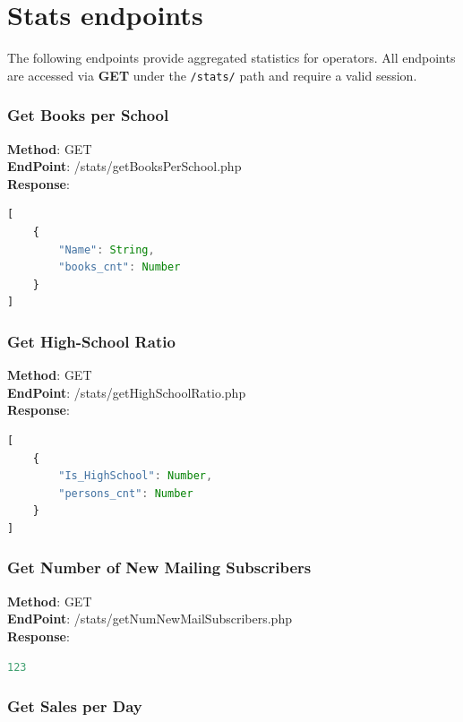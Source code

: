 \chapter{Stats endpoints}

The following endpoints provide aggregated statistics for operators. All endpoints are accessed via \textbf{GET} under the \texttt{/stats/} path and require a valid session.

\subsection*{Get Books per School}

\textbf{Method}: GET \\
\textbf{EndPoint}: /stats/getBooksPerSchool.php \\

\textbf{Response}:
\begin{lstlisting}[language=JavaScript, basicstyle=\ttfamily]
[
    {
        "Name": String,
        "books_cnt": Number
    }
]
\end{lstlisting}

\subsection*{Get High-School Ratio}

\textbf{Method}: GET \\
\textbf{EndPoint}: /stats/getHighSchoolRatio.php \\

\textbf{Response}:
\begin{lstlisting}[language=JavaScript, basicstyle=\ttfamily]
[
    {
        "Is_HighSchool": Number,
        "persons_cnt": Number
    }
]
\end{lstlisting}

\subsection*{Get Number of New Mailing Subscribers}

\textbf{Method}: GET \\
\textbf{EndPoint}: /stats/getNumNewMailSubscribers.php \\

\textbf{Response}:
\begin{lstlisting}[language=JavaScript, basicstyle=\ttfamily]
123
\end{lstlisting}

\subsection*{Get Sales per Day}


